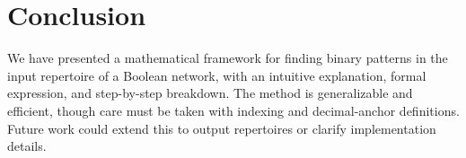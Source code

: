 \documentclass[12pt]{article}
\begin{document}
\section{Conclusion}
We have presented a mathematical framework for finding binary patterns in the input repertoire of a Boolean network, with an intuitive explanation, formal expression, and step-by-step breakdown. The method is generalizable and efficient, though care must be taken with indexing and decimal-anchor definitions. Future work could extend this to output repertoires or clarify implementation details.
\end{document}
